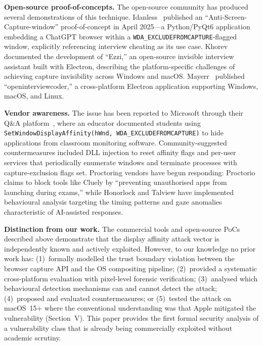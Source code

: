 \documentclass[conference]{IEEEtran}
\begin{document}
\textbf{Open-source proof-of-concepts.} The open-source community has produced several demonstrations of this technique. Idanless~\cite{idanless2025anticapture} published an ``Anti-Screen-Capture-window'' proof-of-concept in April 2025---a Python/PyQt6 application embedding a ChatGPT browser within a \texttt{WDA\_EXCLUDEFROMCAPTURE}-flagged window, explicitly referencing interview cheating as its use case. Khorev~\cite{khorev2026ezzi} documented the development of ``Ezzi,'' an open-source invisible interview assistant built with Electron, describing the platform-specific challenges of achieving capture invisibility across Windows and macOS. Mayerr~\cite{mayerr2025openinterviewcoder} published ``openinterviewcoder,'' a cross-platform Electron application supporting Windows, macOS, and Linux.

\textbf{Vendor awareness.} The issue has been reported to Microsoft through their Q\&A platform~\cite{ukt2024setwindow}, where an educator documented students using \texttt{SetWindowDisplayAffinity(hWnd, WDA\_EXCLUDEFROMCAPTURE)} to hide applications from classroom monitoring software. Community-suggested countermeasures included DLL injection to reset affinity flags and per-user services that periodically enumerate windows and terminate processes with capture-exclusion flags set. Proctoring vendors have begun responding: Proctorio~\cite{proctorio2026blocks} claims to block tools like Cluely by ``preventing unauthorised apps from launching during exams,'' while Honorlock and Talview have implemented behavioural analysis targeting the timing patterns and gaze anomalies characteristic of AI-assisted responses.

\textbf{Distinction from our work.} The commercial tools and open-source PoCs described above demonstrate that the display affinity attack vector is independently known and actively exploited. However, to our knowledge no prior work has: (1)~formally modelled the trust boundary violation between the browser capture API and the OS compositing pipeline; (2)~provided a systematic cross-platform evaluation with pixel-level forensic verification; (3)~analysed which behavioural detection mechanisms can and cannot detect the attack; (4)~proposed and evaluated countermeasures; or (5)~tested the attack on macOS~15+ where the conventional understanding was that Apple mitigated the vulnerability (Section~V). This paper provides the first formal security analysis of a vulnerability class that is already being commercially exploited without academic scrutiny.
\end{document}
